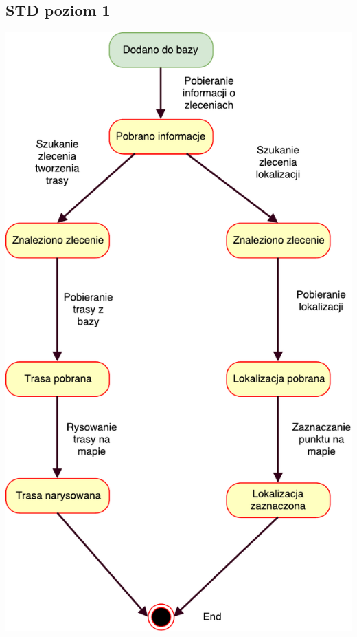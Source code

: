 \documentclass[11pt]{article}
\begin{document}
	\subsection{STD poziom 1}
	\begin{center}
		\includegraphics[scale=0.95]{STD3.pdf}
	\end{center}
	\newpage
\end{document}
